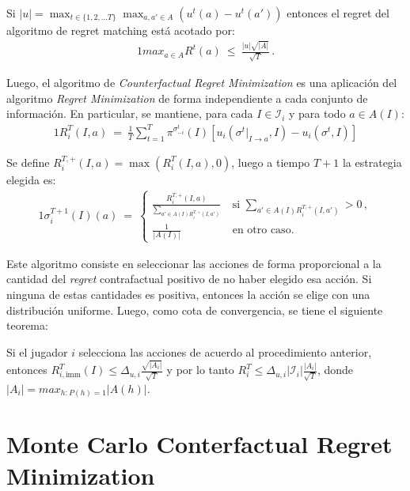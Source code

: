 \begin{theorem}
Si $|u| = \max_{t \in \{1, 2, ... T\}} \max_{a, a' \in A}(u^t(a) - u^t(a'))$ entonces el regret del algoritmo de regret matching está acotado por:
\begin{alignat}{1}
max_{a \in A}R^t(a)\ \leq\ \frac{|u| \sqrt{|A|}}{\sqrt T} \,.
\end{alignat}
\end{theorem}

Luego, el algoritmo de \textit{Counterfactual Regret Minimization} es una aplicación del algoritmo \textit{Regret Minimization} de forma independiente a cada conjunto de información. En particular, se mantiene, para cada $I \in \mathcal{I}_i$ y para todo $a \in A(I)$:
\begin{alignat}{1}
R_i^T(I, a)\ =\ \frac{1}{T} \sum_{t = 1}^T \pi^{\sigma^t_{-i}}(I)[u_i(\sigma^t|_{I \rightarrow a}, I) - u_i(\sigma^t, I)]
\end{alignat}

Se define $R_i^{T, +}(I, a) = \max(R_i^T(I, a), 0)$, luego a tiempo $T+1$ la estrategia elegida es:
\begin{alignat}{1}
\label{eq:cfr-regret-matching}
\sigma_i^{T+1}(I)(a)\ =\
\begin{cases}
\frac{R_i^{T, +}(I, a)}{\sum_{a' \in A(I) R_i^{T, +}(I, a')}}\ & \text{si } \sum_{a' \in A(I) R_i^{T, +}(I, a')} > 0 \,, \\
\frac{1}{|A(I)|}\ & \text{en otro caso.} 
\end{cases}
\end{alignat}

Este algoritmo consiste en seleccionar las acciones de forma proporcional a la cantidad del \textit{regret} contrafactual positivo de no haber elegido esa acción. Si ninguna de estas cantidades es positiva, entonces la acción se elige con una distribución uniforme. Luego, como cota de convergencia, se tiene el siguiente teorema:
\begin{theorem}
Si el jugador $i$ selecciona las acciones de acuerdo al procedimiento anterior, entonces $R^T_{i, \text{imm}}(I) \leq \Delta_{u, i} \frac{\sqrt{|A_i|}}{\sqrt{T}}$ y por lo tanto $R_i^T \leq \Delta_{u, i} |\mathcal{I}_i| \frac{|A_i|}{\sqrt T}$, donde $|A_i| = max_{h : P(h) = 1}{|A(h)|}$.
\end{theorem}


\section{Monte Carlo Conterfactual Regret Minimization}

